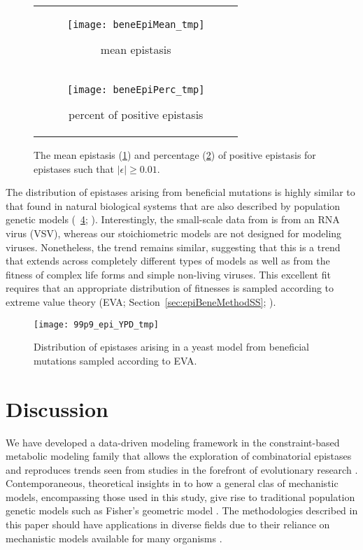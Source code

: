 \begin{figure}
\centering
\begin{tabular}{c}
\begin{subfigure}[b]{\textwidth}
  \texttt{[image: beneEpiMean\_tmp]}
  \caption{mean epistasis} 
  \label{fig:beneEpiPairwise:mean}
\end{subfigure}
\\
\begin{subfigure}[b]{\textwidth}
  \texttt{[image: beneEpiPerc\_tmp]}
  \caption{percent of positive epistasis}
  \label{fig:beneEpiPairwise:perc}
\end{subfigure}
\\
\end{tabular}
\caption{The mean epistasis (\ref{fig:beneEpiPairwise:mean}) and percentage
  (\ref{fig:beneEpiPairwise:perc}) of positive epistasis for epistases such
  that $\left|\epsilon\right| \ge 0.01$.}
\label{fig:beneEpiPairwise}
\end{figure}

The distribution of epistases arising from beneficial mutations is
highly similar to that found in natural biological systems that are
also described by population genetic models
(\Fig~\ref{fig:epiBeneDist}; \citep{Martin2007a}). Interestingly, the
small-scale data from \citet{Martin2007a} is from an RNA virus (VSV),
whereas our stoichiometric models are not designed for modeling
viruses. Nonetheless, the trend remains similar, suggesting that this
is a trend that extends across completely different types of models as
well as from the fitness of complex life forms and simple non-living
viruses. This excellent fit requires that an appropriate distribution
of fitnesses is sampled according to extreme value theory (EVA;
Section~\ref{sec:epiBeneMethodSS}; \citep{Orr2005, Orr2003}).


\begin{figure}
\centering
  \texttt{[image: 99p9\_epi\_YPD\_tmp]}
  \caption{Distribution of epistases arising in a yeast model from
beneficial mutations sampled according to EVA.}
  \label{fig:epiBeneDist}
\end{figure}

\section{Discussion}

We have developed a data-driven modeling framework in the
constraint-based metabolic modeling family that allows the exploration
of combinatorial epistases and reproduces trends seen from studies in
the forefront of evolutionary research \citep{Martin2007a, Chou2011,
Khan2011}. Contemporaneous, theoretical insights in to how a general
clas of mechanistic models, encompassing those used in this study,
give rise to traditional population genetic models such as Fisher's
geometric model \citep{Martin2014}.  The methodologies described in
this paper should have applications in diverse fields due to their
reliance on mechanistic models available for many organisms
\citep{Monk}.

